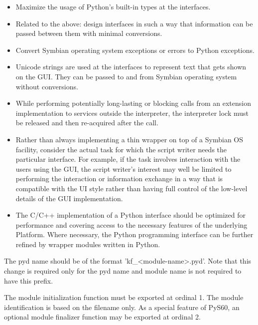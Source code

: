 \begin{itemize}
\item Maximize the usage of Python's built-in types at the interfaces.

\item Related to the above: design interfaces in such a way that information
      can be passed between them with minimal conversions.

\item Convert Symbian operating system exceptions or errors to Python exceptions.

\item Unicode strings are used at the interfaces to represent text that gets
      shown on the GUI. They can be passed to and from Symbian operating system
      without conversions.

\item While performing potentially long-lasting or blocking calls from an
      extension implementation to services outside the interpreter, the
      interpreter lock must be released and then re-acquired after the call.

\item Rather than always implementing a thin wrapper on top of a Symbian OS
      facility, consider the actual task for which the script writer needs the
      particular interface. For example, if the task involves interaction with
      the users using the GUI, the script writer's interest may well be limited
      to performing the interaction or information exchange in a way that is
      compatible with the UI style rather than having full control of the
      low-level details of the GUI implementation.

\item The C/C++ implementation of a Python interface should be optimized for
      performance and covering access to the necessary features of the
      underlying Platform. Where necessary, the Python programming interface can
      be further refined by wrapper modules written in Python.
\end{itemize}

The pyd name should be of the format 'kf_<module-name>.pyd'. Note that this change
is required only for the pyd name and module name is not required to have this prefix.

The module initialization function must be exported at ordinal 1. The module
identification is based on the filename only. As a special feature of PyS60, an
optional module finalizer function may be exported at ordinal 2.

